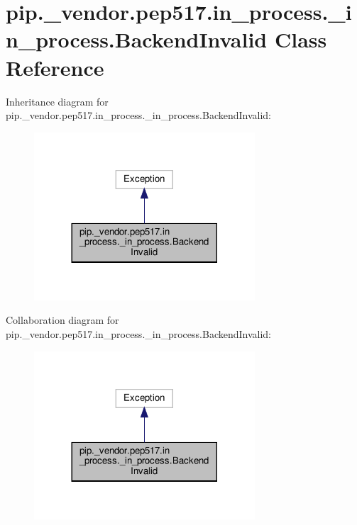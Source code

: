\hypertarget{classpip_1_1__vendor_1_1pep517_1_1in__process_1_1__in__process_1_1BackendInvalid}{}\section{pip.\+\_\+vendor.\+pep517.\+in\+\_\+process.\+\_\+in\+\_\+process.\+Backend\+Invalid Class Reference}
\label{classpip_1_1__vendor_1_1pep517_1_1in__process_1_1__in__process_1_1BackendInvalid}


Inheritance diagram for pip.\+\_\+vendor.\+pep517.\+in\+\_\+process.\+\_\+in\+\_\+process.\+Backend\+Invalid\+:
\nopagebreak
\begin{figure}[H]
\begin{center}
\leavevmode
\includegraphics[width=233pt]{classpip_1_1__vendor_1_1pep517_1_1in__process_1_1__in__process_1_1BackendInvalid__inherit__graph}
\end{center}
\end{figure}


Collaboration diagram for pip.\+\_\+vendor.\+pep517.\+in\+\_\+process.\+\_\+in\+\_\+process.\+Backend\+Invalid\+:
\nopagebreak
\begin{figure}[H]
\begin{center}
\leavevmode
\includegraphics[width=233pt]{classpip_1_1__vendor_1_1pep517_1_1in__process_1_1__in__process_1_1BackendInvalid__coll__graph}
\end{center}
\end{figure}
